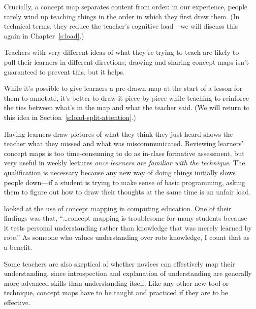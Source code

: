 \begin{description}
\tightlist
\item[Helping teachers figure out what they're trying to teach.]
Crucially, a concept map separates content from order: in our
experience, people rarely wind up teaching things in the order in
which they first drew them. (In technical terms, they reduce the
teacher's cognitive load---we will discuss this again in
Chapter~\ref{s:load}.)
\item[Aiding communication between lesson designers.]
Teachers with very different ideas of what they're trying to teach
are likely to pull their learners in different directions; drawing
and sharing concept maps isn't guaranteed to prevent this, but it
helps.
\item[Aiding communication with learners.]
While it's possible to give learners a pre-drawn map at the start of
a lesson for them to annotate, it's better to draw it piece by piece
while teaching to reinforce the ties between what's in the map and
what the teacher said. (We will return to this idea in
Section~\ref{s:load-split-attention}.)
\item[For assessment.]
Having learners draw pictures of what they think they just heard
shows the teacher what they missed and what was miscommunicated.
Reviewing learners' concept maps is too time-consuming to do as
in-class formative assessment, but very useful in weekly lectures
\emph{once learners are familiar with the technique}. The qualification
is necessary because any new way of doing things initially slows
people down---if a student is trying to make sense of basic
programming, asking them to figure out how to draw their thoughts at
the same time is an unfair load.
\end{description}

\cite{Kepp2008} looked at the use of concept mapping in computing
education. One of their findings was that, ``\ldots{}concept
mapping is troublesome for many students because it tests personal
understanding rather than knowledge that was merely learned by rote.'' As
someone who values understanding over rote knowledge, I count that as a
benefit.

Some teachers are also skeptical of whether novices can effectively map
their understanding, since introspection and explanation of
understanding are generally more advanced skills than understanding
itself. Like any other new tool or technique, concept maps have to be
taught and practiced if they are to be effective.

